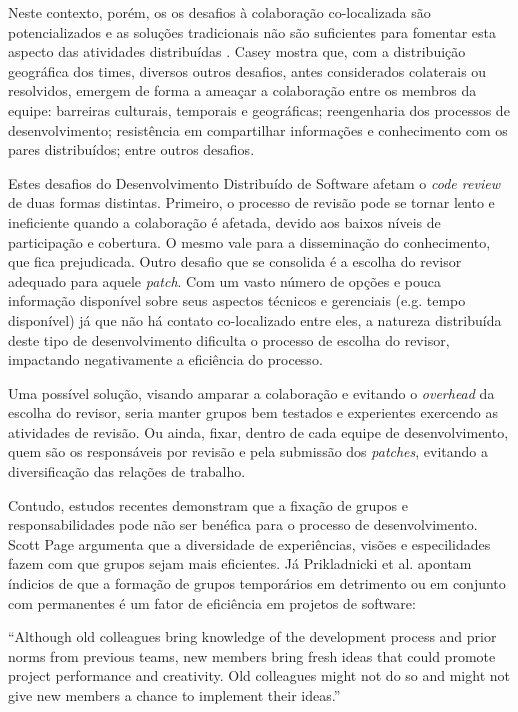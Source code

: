 \documentclass[12pt,openany,oneside,a4paper,english,brazil]{abntbibufjf}
\begin{document}
  Neste contexto, porém, os os desafios à colaboração co-localizada são potencializados e as soluções tradicionais não são suficientes para fomentar esta aspecto das atividades distribuídas \cite{nicolaci2011}. Casey \cite{casey2010} mostra que, com a distribuição geográfica dos times, diversos outros desafios, antes considerados colaterais ou resolvidos, emergem de forma a ameaçar a colaboração entre os membros da equipe: barreiras culturais, temporais e geográficas; reengenharia dos processos de desenvolvimento; resistência em compartilhar informações e conhecimento com os pares distribuídos; entre outros desafios.

  Estes desafios do Desenvolvimento Distribuído de Software afetam o \textit{code review} de duas formas distintas. Primeiro, o processo de revisão pode se tornar lento e ineficiente quando a colaboração é afetada, devido aos baixos níveis de participação e cobertura. O mesmo vale para a disseminação do conhecimento, que fica prejudicada. Outro desafio que se consolida é a escolha do revisor adequado para aquele \textit{patch}. Com um vasto número de opções e pouca informação disponível sobre seus aspectos técnicos e gerenciais (e.g. tempo disponível) já que não há contato co-localizado entre eles, a natureza distribuída deste tipo de desenvolvimento dificulta o processo de escolha do revisor, impactando negativamente a eficiência do processo.

  Uma possível solução, visando amparar a colaboração e evitando o \textit{overhead} da escolha do revisor, seria manter grupos bem testados e experientes exercendo as atividades de revisão. Ou ainda, fixar, dentro de cada equipe de desenvolvimento, quem são os responsáveis por revisão e pela submissão dos \textit{patches}, evitando a diversificação das relações de trabalho.

  Contudo, estudos recentes demonstram que a fixação de grupos e responsabilidades pode não ser benéfica para o processo de desenvolvimento. Scott Page \cite{page2008} argumenta que a diversidade de experiências, visões e especilidades fazem com que grupos sejam mais eficientes. Já Prikladnicki et al. \cite{prikladnicki2017} apontam índicios de que a formação de grupos temporários em detrimento ou em conjunto com permanentes é um fator de eficiência em projetos de software:

  \begin{description}
    ``Although old colleagues bring knowledge of the development process and prior norms from previous teams, new members bring fresh ideas that could promote project performance and creativity. Old colleagues might not do so and might not give new members a chance to implement their ideas.''
  \end{description}
\end{document}
